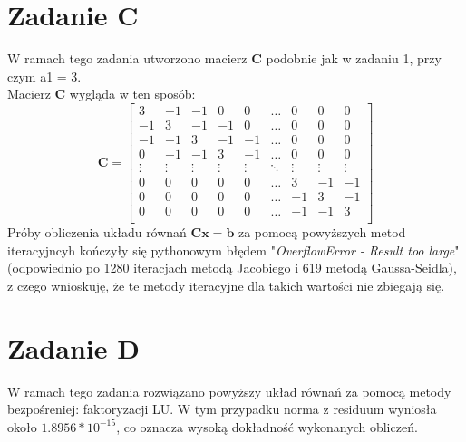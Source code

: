 \documentclass{article} %
\begin{document}
\section{Zadanie C}
W ramach tego zadania utworzono macierz \textbf{C} podobnie jak w zadaniu 1, przy czym a1 = 3. \\
Macierz \textbf{C} wygląda w ten sposób: \\
\[
\textbf{C} = 
\begin{bmatrix}
    3 & -1 & -1 & 0 & 0 &\dots & 0 & 0 & 0 \\
    -1 & 3 & -1 & -1 & 0 & \dots & 0 & 0 & 0\\
    -1 & -1 & 3 & -1 & -1 & \dots & 0 & 0 & 0 \\
    0 & -1 & -1 & 3 & -1 & \dots & 0 & 0 & 0 \\
    \vdots & \vdots & \vdots & \vdots & \vdots & \ddots & \vdots & \vdots & \vdots \\
    0 & 0 & 0 & 0 & 0 & \dots & 3 & -1 & -1 \\
    0 & 0 & 0 & 0 & 0 & \dots & -1 & 3 & -1 \\
    0 & 0 & 0 & 0 & 0 & \dots & -1 & -1 & 3 \\
\end{bmatrix}
\]
Próby obliczenia układu równań \(\mathbf{Cx}=\mathbf{b}\) 
za pomocą powyższych metod iteracyjncyh kończyły się pythonowym błędem "\textit{OverflowError - Result too large}" 
(odpowiednio po 1280 iteracjach metodą Jacobiego i 619 metodą Gaussa-Seidla),
z czego wnioskuję, że te metody iteracyjne dla takich wartości nie zbiegają się.
\section{Zadanie D}
W ramach tego zadania rozwiązano powyższy układ równań za pomocą
 metody bezpośreniej: faktoryzacji LU. 
W tym przypadku norma z residuum wyniosła około \(1.8956*10^{-15}\),
 co oznacza wysoką dokładność wykonanych obliczeń.
\end{document}
